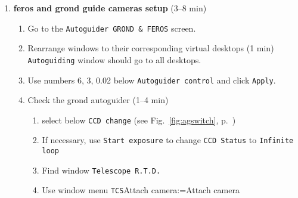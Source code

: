 \documentclass[11pt,fleqn]{book}
\makeatletter
\def\menu#1#2{\texttt{#1}\ifx{}#2\else\@for\@x:=#2\do{$\rightarrow$\texttt{\@x}}\fi}
\def\wmenu#1#2{window menu \menu{#1}{#2}}
\def\figref#1{Fig.~\ref{fig:#1}, p.~\pageref{fig:#1}}
\makeatother
\begin{document}
\begin{enumerate}
\begin{enumerate}
\begin{enumerate}
               \item Find the \gls{rtd} window (griz images).
               \item Check that image is flipped along both axes and rotated (see \figref{flip}).
               \item Go to the \texttt{GROND infrared (IRACE)} screen.
               \item Find the irtd window (JHK images).               
               \item Check that images are received live.\\
                     The left column should have a green button with text \texttt{Stop} (see \figref{iflip}).\\
                     If it is gray with text \texttt{Start}, click it so that it gets as describe above.
              \item Check that the image is horizontally flipped (see \figref{iflip}).
              \item Check that the image has positive pixel values\\
                    Find menu option \texttt{Negative real time image}
             \end{enumerate}
        \end{enumerate}
  \item \textbf{\gls{feros} and \gls{grond} guide cameras setup} (3--8 min)\label{list:ag}
        \begin{enumerate}
           \item Go to the \texttt{Autoguider GROND \& FEROS} screen. 
           \item Rearrange windows to their corresponding virtual desktops (1 min)\\
                 \texttt{Autoguiding} window should go to all desktops.
           \item Use numbers 6, 3, 0.02 below \texttt{Autoguider control} and click \texttt{Apply}.
           \item Check the \gls{grond} autoguider (1--4 min)
               \begin{enumerate}
                  \item select  below \texttt{CCD change} (see \figref{agswitch})
                  \item If necessary, use \texttt{Start exposure} to change \texttt{CCD Status} to \texttt{Infinite loop}
                  \item Find window \texttt{Telescope R.T.D.}
                  \item Use \wmenu{TCS}{Attach camera}

\end{enumerate}
\end{enumerate}
\end{enumerate}
\end{document}
